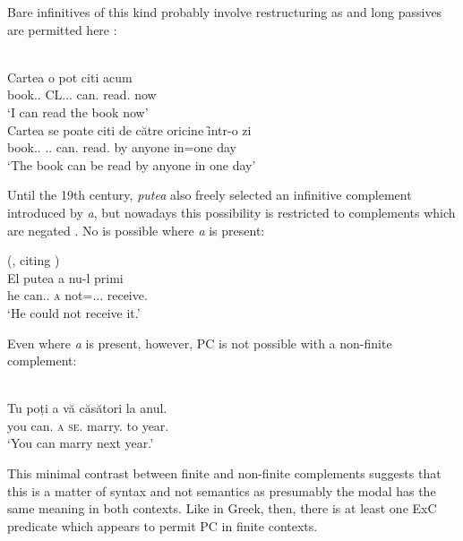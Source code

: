 \documentclass[output=paper]{langsci/langscibook}
\begin{document}
Bare infinitives of this kind probably involve restructuring as 
and long passives are permitted here \citep[194, 196]{Dragomirescu2013}:

\ea%
    \label{ex:24.36}\\
	\gll Cartea     o       pot   citi   acum\\
        book.\Def{}.\Acc{}   CL.\Acc{}.\glossF.\Tsg{}   can.\Fsg{}   read.\Inf{} now\\
	\glt ‘I can read the book now’
\ex%
    \label{ex:24.37}\\
	\gll Cartea     se          poate      citi   de {către oricine} ȋntr-o zi\\
    book.\Def{}.\Nom{}   \Cl.\Refl.\Pass{} can.\Tsg{} read.\Inf{}   by anyone   in=one day\\
	\glt ‘The book can be read by anyone in one day’
\z

Until the 19th century, \emph{putea} also freely selected an infinitive
complement introduced by \emph{a}, but nowadays this possibility is restricted
to complements which are negated \citep{Dragomirescu2013}. No 
is possible where \emph{a} is present:

\ea%
    \label{ex:24.38} (\citealt[194]{PanaDindelegan2013}, citing \citealt[60]{Jordan2009})\\
	\gll El putea       a   nu-l       primi\\
    he can.\Ipfv{}.\Tsg{}   \textsc{a}   not=\Cl.\Acc{}.\M.\Tsg{}   receive.\Inf{}\\
	\glt ‘He could not receive it.’
\z

Even where \emph{a} is present, however, \gls{PC} is not possible with a non-finite complement:

\ea%
    \label{ex:24.39}\\
	\gll \llap{*}Tu   poți   a vă     căsători   la anul.\\
        you   can.\Ssg{} \textsc{a} \textsc{se}.\Spl{}  marry.\Inf{}   to year.\Def{}\\
    \glt ‘You can marry next year.’
\z

This minimal contrast between finite and non-finite complements suggests that
this is a matter of syntax and not semantics as presumably the modal has the
same meaning in both contexts. Like in Greek, then, there is at least one
\gls{ExC} predicate which appears to permit
\gls{PC} in finite  contexts.
\end{document}
